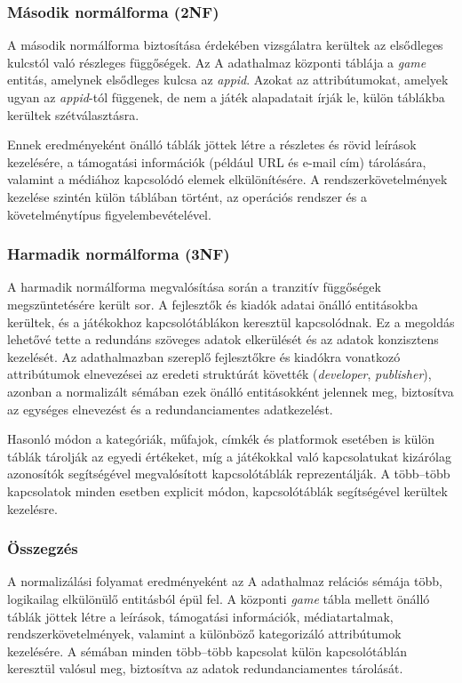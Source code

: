 \subsubsection{Második normálforma (2NF)}

A második normálforma biztosítása érdekében vizsgálatra kerültek az elsődleges kulcstól való részleges függőségek. Az A adathalmaz központi táblája a \textit{game} entitás, amelynek elsődleges kulcsa az \textit{appid}. Azokat az attribútumokat, amelyek ugyan az \textit{appid}-tól függenek, de nem a játék alapadatait írják le, külön táblákba kerültek szétválasztásra.

Ennek eredményeként önálló táblák jöttek létre a részletes és rövid leírások kezelésére, a támogatási információk (például URL és e-mail cím) tárolására, valamint a médiához kapcsolódó elemek elkülönítésére. A rendszerkövetelmények kezelése szintén külön táblában történt, az operációs rendszer és a követelménytípus figyelembevételével.

\subsubsection{Harmadik normálforma (3NF)}

A harmadik normálforma megvalósítása során a tranzitív függőségek megszüntetésére került sor. A fejlesztők és kiadók adatai önálló entitásokba kerültek, és a játékokhoz kapcsolótáblákon keresztül kapcsolódnak. Ez a megoldás lehetővé tette a redundáns szöveges adatok elkerülését és az adatok konzisztens kezelését. Az adathalmazban szereplő fejlesztőkre és kiadókra vonatkozó attribútumok elnevezései az eredeti struktúrát követték (\textit{developer}, \textit{publisher}), azonban a normalizált sémában ezek önálló entitásokként jelennek meg, biztosítva az egységes elnevezést és a redundanciamentes adatkezelést.

Hasonló módon a kategóriák, műfajok, címkék és platformok esetében is külön táblák tárolják az egyedi értékeket, míg a játékokkal való kapcsolatukat kizárólag azonosítók segítségével megvalósított kapcsolótáblák reprezentálják. A több–több kapcsolatok minden esetben explicit módon, kapcsolótáblák segítségével kerültek kezelésre.

\subsubsection{Összegzés}

A normalizálási folyamat eredményeként az A adathalmaz \cite{a} relációs sémája több, logikailag elkülönülő entitásból épül fel. A központi \textit{game} tábla mellett önálló táblák jöttek létre a leírások, támogatási információk, médiatartalmak, rendszerkövetelmények, valamint a különböző kategorizáló attribútumok kezelésére. A sémában minden több–több kapcsolat külön kapcsolótáblán keresztül valósul meg, biztosítva az adatok redundanciamentes tárolását.

